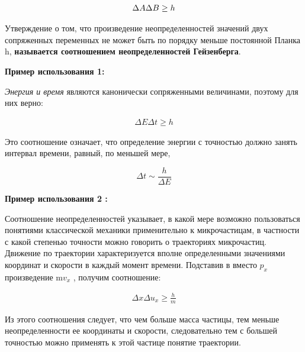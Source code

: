 \documentclass[__main__.tex]{subfiles}
\begin{document}
\begin{gather}
	\llabel{_28:heiz}
	\Delta A\Delta B\geq h
\end{gather}

Утверждение  о том, что произведение неопределенностей значений двух сопряженных переменных не может быть по порядку меньше постоянной Планка h, \textbf{называется соотношением неопределенностей Гейзенберга}.

\textbf{Пример использования 1:}

\textit{Энергия и время} являются канонически сопряженными величинами, поэтому для них верно:

\begin{gather}
	\Delta E\Delta t\geq h
\end{gather}

Это соотношение означает, что определение энергии с точностью   должно занять интервал времени, равный, по меньшей мере,

$$
\Delta t \sim \frac{h}{\Delta E}
$$

\textbf{Пример использования 2 :}

Соотношение неопределенностей указывает, в какой мере возможно пользоваться понятиями классической механики применительно к микрочастицам, в частности с какой степенью точности можно говорить о траекториях микрочастиц. Движение по траектории характеризуется вполне определенными значениями координат и скорости в каждый момент времени. Подставив в  вместо $p_{x}$  произведение m$v_x$  , получим соотношение:

\begin{gather}
	\Delta x\Delta u_{x}\geq \frac{h}{m}
\end{gather}

Из этого соотношения следует, что чем больше масса частицы, тем меньше неопределенности ее координаты и скорости, следовательно тем с большей точностью можно применять к этой частице понятие траектории. 
\end{document}
